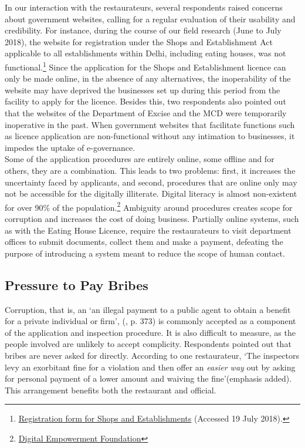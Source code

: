 \documentclass[a4paper, 12pt]{article}
\begin{document}
		In our interaction with the restaurateurs, several respondents raised concerns about government websites, calling for a regular evaluation of their usability and credibility. For instance, during the course of our field research (June to July 2018), the 
website for registration under the Shops and Establishment Act applicable to all establishments within Delhi, including eating houses, was not functional.\footnote{\href{https://bit.ly/2xfB6UJ}{Registration form for Shops and Establishments} (Accessed 19 July 
2018).} Since the application for the Shops and Establishment licence can only be made online, in the absence of any alternatives, the inoperability of the website may have deprived the businesses set up during this period from the facility to apply for the licence. 
Besides this, two respondents also pointed out that the websites of the Department of Excise and the MCD were temporarily inoperative in the past. When government websites that facilitate functions such as licence application are non-functional without any 
intimation to businesses, it impedes the uptake of e-governance. \\
		
		Some of the application procedures are entirely online, some offline and for others, they are a combination. This leads to two problems: first, it increases the uncertainty faced by applicants, and second, procedures that are online only may not be 
accessible for the digitally illiterate. Digital literacy is almost non-existent for over 90\% of the population.\footnote{\href{https://bit.ly/2NMWdaj}{Digital Empowerment Foundation}}  Ambiguity around procedures creates scope for corruption and increases the cost of 
doing business. Partially online systems, such as with the Eating House Licence, require the restaurateurs to visit department offices to submit documents, collect them and make a payment, defeating the purpose of introducing a system meant to reduce the scope 
of human contact.
		
		\subsection{Pressure to Pay Bribes}
		Corruption, that is, an ‘an illegal payment to a public agent to obtain a benefit for a private individual or firm’, (\cite{rose2008corruption}, p. 373) is commonly accepted as a component of the application and inspection procedure. It is also difficult to measure, 
as the people involved are unlikely to accept complicity. Respondents pointed out that bribes are never asked for directly. According to one restaurateur, ‘The inspectors levy an exorbitant fine for a violation and then offer an \textit{easier way} out by asking for 
personal payment of a lower amount and waiving the fine’(emphasis added). This arrangement benefits both the restaurant and official.\\
\end{document}
